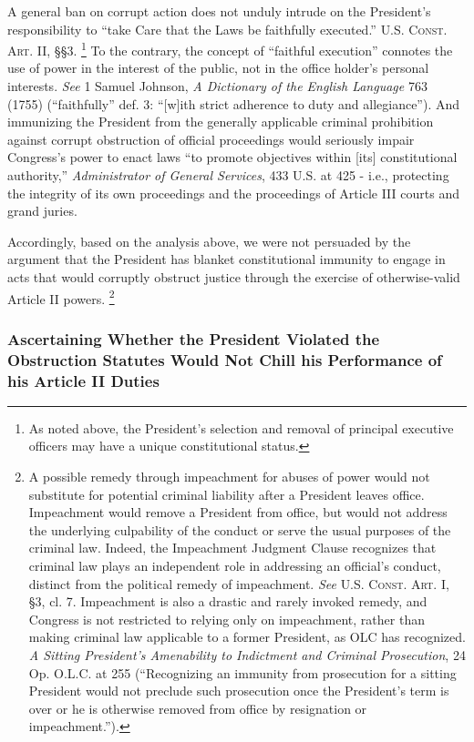 A general ban on corrupt action does not unduly intrude on the President’s responsibility to “take Care that the Laws be faithfully executed.”
\textsc{U.S. Const. Art. II}, \S\S 3.%
\footnote{As noted above, the President’s selection and removal of principal executive officers may have a unique constitutional status.}
To the contrary, the concept of “faithful execution” connotes the use of power in the interest of the public, not in the office holder’s personal interests.
\textit{See} 1 Samuel Johnson, \textit{A Dictionary of the English Language} 763 (1755) (“faithfully” def. 3: “[w]ith strict adherence to duty and allegiance”).
And immunizing the President from the generally applicable criminal prohibition against corrupt obstruction of official proceedings would seriously impair Congress’s power to enact laws “to promote objectives within [its] constitutional authority,” \textit{Administrator of General Services}, 433 U.S. at 425 - i.e., protecting the integrity of its own proceedings and the proceedings of Article III courts and grand juries.

Accordingly, based on the analysis above, we were not persuaded by the argument that the President has blanket constitutional immunity to engage in acts that would corruptly obstruct justice through the exercise of otherwise-valid Article II powers.%
\footnote{A possible remedy through impeachment for abuses of power would not substitute for potential criminal liability after a President leaves office.
Impeachment would remove a President from office, but would not address the underlying culpability of the conduct or serve the usual purposes of the criminal law.
Indeed, the Impeachment Judgment Clause recognizes that criminal law plays an independent role in addressing an official’s conduct, distinct from the political remedy of impeachment.
\textit{See} \textsc{U.S. Const. Art}. I, \S 3, cl. 7.
Impeachment is also a drastic and rarely invoked remedy, and Congress is not restricted to relying only on impeachment, rather than making criminal law applicable to a former President, as OLC has recognized.
\textit{A Sitting President's Amenability to Indictment and Criminal Prosecution}, 24 Op. O.L.C. at 255 (“Recognizing an immunity from prosecution for a sitting President would not preclude such prosecution once the President’s term is over or he is otherwise removed from office by resignation or impeachment.”).}

\subsubsection{Ascertaining Whether the President Violated the Obstruction Statutes Would Not Chill his Performance of his Article II Duties}


